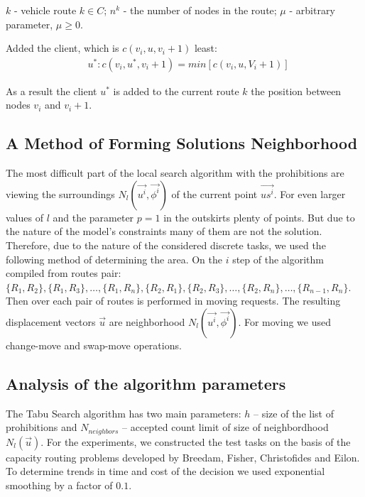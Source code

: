 \documentclass[]{TAACpaper}
\begin{document}
$k$ - vehicle route $k\in C$;
$n^k$ - the number of nodes in the route;
$\mu$ - arbitrary parameter, $\mu \ge 0 $.

Added the client, which is $c(v_i,u,v_i+1)$ least:
\begin{align} 
& u^*:c(v_i,u^*,v_i+1)=min[c(v_i,u,V_i+1)]
\end{align}	

As a result the client $u^*$ is added to the current route $k$ the position between nodes $v_i$ and $v_i+1$.

\subsection{A Method of Forming Solutions Neighborhood}
The most difficult part of the local search algorithm with the prohibitions are viewing the surroundings $N_l(\vec{u^i},\vec{\phi^i})$ of the current point $\vec{us^i}$. For even larger values of $l$ and the parameter $p=1$ in the outskirts plenty of points. But due to the nature of the model's constraints many of them are not the solution. Therefore, due to the nature of the considered discrete tasks, we used the following method of determining the area. On the $i$ step of the algorithm compiled from routes pair: $\{R_1,R_2\},\{R_1,R_3\},\dots,\{R_1,R_n\},\{R_2,R_1\}, \{R_2,R_3\},\dots,\{R_2,R_n\},\dots,\{R_{n-1},R_{n}\}$. Then over each pair of routes is performed in moving requests. The resulting displacement vectors $\vec{u}$ are neighborhood $N_l(\vec{u^i},\vec{\phi^i})$. For moving  we used change-move  and swap-move operations.


\subsection{Analysis of the algorithm parameters}
The Tabu Search algorithm has two main parameters: $h$ -- size of the list of prohibitions and $N_{neighbors}$ -- accepted count limit of size of neighbordhood $N_l(\vec{u})$. For the experiments, we constructed the test tasks on the basis of the capacity routing problems developed by Breedam, Fisher, Christofides and Eilon. To determine trends in time and cost of the decision we used exponential smoothing by a factor of $0.1$.
\end{document}
